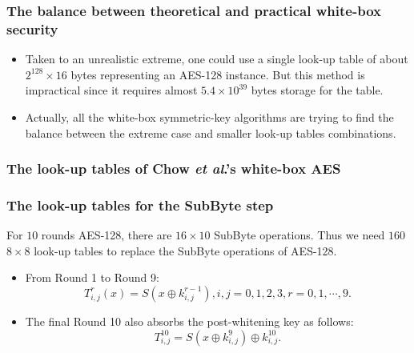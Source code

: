 \documentclass{beamer}
\begin{document}
\frame
{
\frametitle{The balance between theoretical and practical white-box security}
\begin{itemize}
\item Taken to an unrealistic extreme, one could use a single look-up table of about $2^{128}\times 16$ bytes representing an AES-128 instance. But this method is impractical since it requires almost $5.4 \times 10^{39}$ bytes storage for the table.

\item Actually, all the white-box symmetric-key algorithms are trying to \textcolor[rgb]{1.00,0.00,0.00}{find the balance between the extreme case and smaller look-up tables combinations}.
\end{itemize}
}

\frame
{
\frametitle{The look-up tables of Chow \textit{et al}.'s white-box AES}
\begin{center}
\end{center}
}

\frame
{
\frametitle{The look-up tables for the SubByte step}
For $10$ rounds AES-128, there are $16\times 10$ SubByte operations. Thus we need $160$ $8\times 8$ look-up tables to replace the SubByte operations of AES-128.
\begin{itemize}
\item From Round 1 to Round 9:
\[T^{r}_{i,j}(x)=S(x\oplus k^{r-1}_{i,j}), i,j={0,1,2,3},r={0,1,\cdots, 9}.\]

\item The final Round 10 also absorbs the post-whitening key as follows:
    \[T^{10}_{i,j}=S(x\oplus k^{9}_{i,j})\oplus k^{10}_{i,j}.\]
\end{itemize}
}
\end{document}
